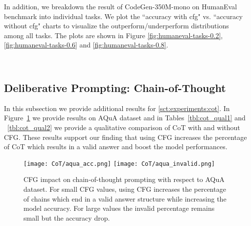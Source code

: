 \documentclass{article}
\begin{document}
In addition, we breakdown the result of CodeGen-350M-mono on HumanEval benchmark into individual tasks. We plot the ``accuracy with cfg" vs. ``accuracy without cfg" charts to visualize the outperform/underperform distributions among all tasks. The plots are shown in Figure \ref{fig:humaneval-tasks-0.2}, \ref{fig:humaneval-tasks-0.6} and \ref{fig:humaneval-tasks-0.8}.

\begin{figure}[!ht]
    \centering
     \\ 
\end{figure}


\subsection{Deliberative Prompting: Chain-of-Thought}
\label{app:cot}
In this subsection we provide additional results for \ref{sct:experiments:cot}. In Figure~\ref{fig:cot_aqua} we provide results on AQuA dataset and in Tables~\ref{tbl:cot_qual1} and ~\ref{tbl:cot_qual2} we provide a qualitative comparison of CoT with and without CFG. These results support our finding that using CFG increases the percentage of CoT which results
in a valid answer and boost the model performances. 
\begin{figure}[!ht]
    \texttt{[image: CoT/aqua\_acc.png]}
    \texttt{[image: CoT/aqua\_invalid.png]}
    \caption{CFG impact on chain-of-thought prompting with respect to AQuA dataset.  For small CFG values, using CFG increases the percentage of chains which end in a valid answer structure while increasing the model accuracy. For large values the invalid percentage remains small but the accuracy drop.}\label{fig:cot_aqua}
\end{figure}
\end{document}
